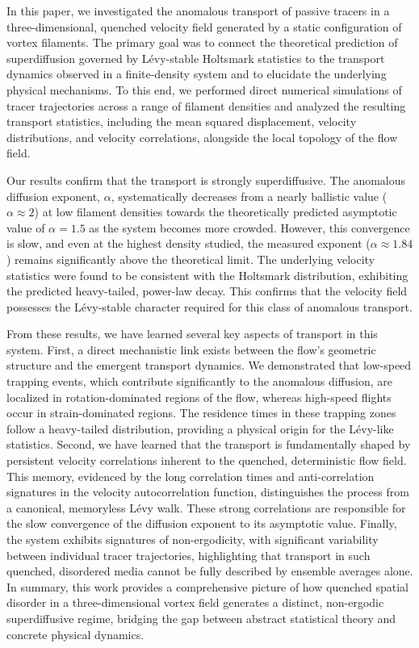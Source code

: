 \documentclass[]{article}
\begin{document}
In this paper, we investigated the anomalous transport of passive tracers in a three-dimensional, quenched velocity field generated by a static configuration of vortex filaments. The primary goal was to connect the theoretical prediction of superdiffusion governed by Lévy-stable Holtsmark statistics to the transport dynamics observed in a finite-density system and to elucidate the underlying physical mechanisms. To this end, we performed direct numerical simulations of tracer trajectories across a range of filament densities and analyzed the resulting transport statistics, including the mean squared displacement, velocity distributions, and velocity correlations, alongside the local topology of the flow field.

Our results confirm that the transport is strongly superdiffusive. The anomalous diffusion exponent, $\alpha$, systematically decreases from a nearly ballistic value ($\alpha \approx 2$) at low filament densities towards the theoretically predicted asymptotic value of $\alpha = 1.5$ as the system becomes more crowded. However, this convergence is slow, and even at the highest density studied, the measured exponent ($\alpha \approx 1.84$) remains significantly above the theoretical limit. The underlying velocity statistics were found to be consistent with the Holtsmark distribution, exhibiting the predicted heavy-tailed, power-law decay. This confirms that the velocity field possesses the Lévy-stable character required for this class of anomalous transport.

From these results, we have learned several key aspects of transport in this system. First, a direct mechanistic link exists between the flow's geometric structure and the emergent transport dynamics. We demonstrated that low-speed trapping events, which contribute significantly to the anomalous diffusion, are localized in rotation-dominated regions of the flow, whereas high-speed flights occur in strain-dominated regions. The residence times in these trapping zones follow a heavy-tailed distribution, providing a physical origin for the Lévy-like statistics. Second, we have learned that the transport is fundamentally shaped by persistent velocity correlations inherent to the quenched, deterministic flow field. This memory, evidenced by the long correlation times and anti-correlation signatures in the velocity autocorrelation function, distinguishes the process from a canonical, memoryless Lévy walk. These strong correlations are responsible for the slow convergence of the diffusion exponent to its asymptotic value. Finally, the system exhibits signatures of non-ergodicity, with significant variability between individual tracer trajectories, highlighting that transport in such quenched, disordered media cannot be fully described by ensemble averages alone. In summary, this work provides a comprehensive picture of how quenched spatial disorder in a three-dimensional vortex field generates a distinct, non-ergodic superdiffusive regime, bridging the gap between abstract statistical theory and concrete physical dynamics.
\end{document}
